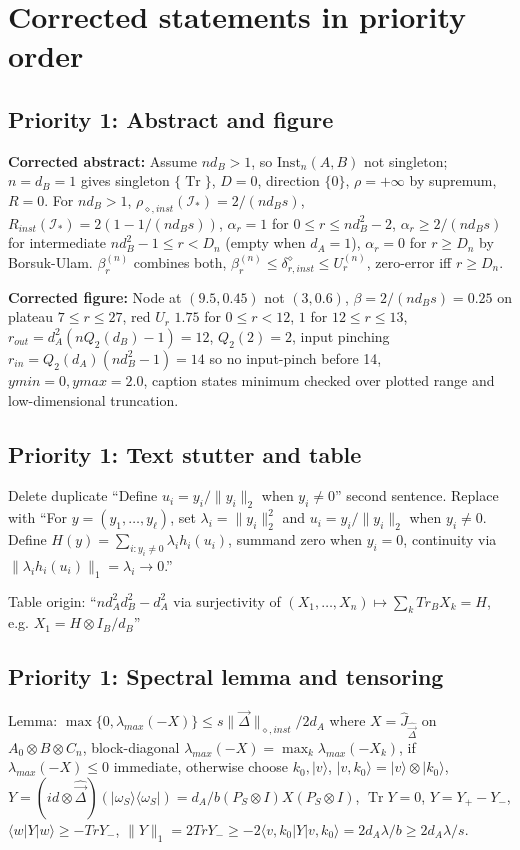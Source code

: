 \documentclass[11pt,a4paper]{article}
\newcommand{\Inst}{\mathrm{Inst}}
\newcommand{\Tr}{\operatorname{Tr}}
\begin{document}
\section{Corrected statements in priority order}

\subsection{Priority 1: Abstract and figure}

\textbf{Corrected abstract:}
Assume $nd_B>1$, so $\Inst_n(A,B)$ not singleton; $n=d_B=1$ gives singleton $\{\Tr\}$, $D=0$, direction $\{0\}$, $\rho=+\infty$ by supremum, $R=0$. For $nd_B>1$, $\rho_{\diamond,inst}(\mathcal I_*)=2/(nd_Bs)$, $R_{inst}(\mathcal I_*)=2(1-1/(nd_Bs))$, $\alpha_r=1$ for $0\le r\le nd_B^2-2$, $\alpha_r\ge2/(nd_Bs)$ for intermediate $nd_B^2-1\le r<D_n$ (empty when $d_A=1$), $\alpha_r=0$ for $r\ge D_n$ by Borsuk-Ulam. $\beta_r^{(n)}$ combines both, $\beta_r^{(n)}\le\delta_{r,inst}^\diamond\le U_r^{(n)}$, zero-error iff $r\ge D_n$.

\textbf{Corrected figure:}
Node at $(9.5,0.45)$ not $(3,0.6)$, $\beta=2/(nd_Bs)=0.25$ on plateau $7\le r\le27$, red $U_r$ $1.75$ for $0\le r<12$, $1$ for $12\le r\le13$, $r_{out}=d_A^2(nQ_2(d_B)-1)=12$, $Q_2(2)=2$, input pinching $r_{in}=Q_2(d_A)(nd_B^2-1)=14$ so no input-pinch before 14, $ymin=0,ymax=2.0$, caption states minimum checked over plotted range and low-dimensional truncation.

\subsection{Priority 1: Text stutter and table}

Delete duplicate ``Define $u_i=y_i/\|y_i\|_2$ when $y_i\ne0$'' second sentence. Replace with ``For $y=(y_1,\dots,y_\ell)$, set $\lambda_i=\|y_i\|_2^2$ and $u_i=y_i/\|y_i\|_2$ when $y_i\ne0$. Define $H(y)=\sum_{i:y_i\ne0}\lambda_i h_i(u_i)$, summand zero when $y_i=0$, continuity via $\|\lambda_i h_i(u_i)\|_1=\lambda_i\to0$.''

Table origin: ``$nd_A^2d_B^2-d_A^2$ via surjectivity of $(X_1,\dots,X_n)\mapsto\sum_kTr_BX_k=H$, e.g. $X_1=H\otimes I_B/d_B$''

\subsection{Priority 1: Spectral lemma and tensoring}

Lemma: $\max\{0,\lambda_{max}(-X)\}\le s\|\vec\Delta\|_{\diamond,inst}/2d_A$ where $X=\widehat J_{\widehat{\vec\Delta}}$ on $A_0\otimes B\otimes C_n$, block-diagonal $\lambda_{max}(-X)=\max_k\lambda_{max}(-X_k)$, if $\lambda_{max}(-X)\le0$ immediate, otherwise choose $k_0,|v\rangle$, $|v,k_0\rangle=|v\rangle\otimes|k_0\rangle$, $Y=(id\otimes\widehat{\vec\Delta})(|\omega_S\rangle\langle\omega_S|)=d_A/b(P_S\otimes I)X(P_S\otimes I)$, $\Tr Y=0$, $Y=Y_+-Y_-$, $\langle w|Y|w\rangle\ge-Tr Y_-$, $\|Y\|_1=2Tr Y_-\ge-2\langle v,k_0|Y|v,k_0\rangle=2d_A\lambda/b\ge2d_A\lambda/s$.
\end{document}
